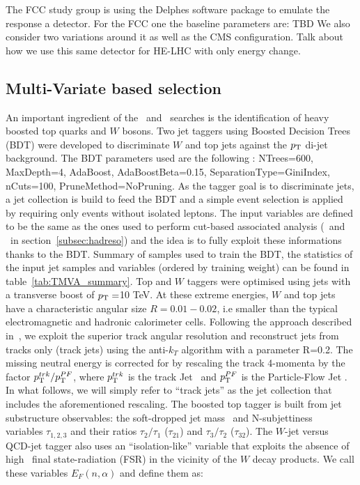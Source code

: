 The FCC study group is using the Delphes software package to emulate the response a detector. 
For the FCC one the baseline parameters are: TBD
We also consider two variations around it as well as the CMS configuration.
Talk about how we use this same detector for HE-LHC with only energy change.


\subsection{Multi-Variate based selection}
\label{subsec:mvatagger}

An important ingredient of the \Zptt\ and \rsg\ searches is the identification of heavy boosted top quarks and $W$ bosons. Two jet taggers using Boosted Decision Trees (BDT) were developed to discriminate $W$ and top jets against the $p_{\text{T}}$ di-jet background.
\newline
The BDT parameters used are the following : NTrees=600, MaxDepth=4, AdaBoost, AdaBoostBeta=0.15, SeparationType=GiniIndex, nCuts=100, PruneMethod=NoPruning. As the tagger goal is to discriminate jets, a jet collection is build to feed the BDT and a simple event selection is applied by requiring only events without isolated leptons.
The input variables are defined to be the same as the ones used to perform cut-based associated analysis (\Zptt\ and \rsg\ in section~\ref{subsec:hadreso}) and the idea is to fully exploit these informations thanks to the BDT. Summary of samples used to train the BDT, the statistics of the input jet samples and variables (ordered by training weight) can be found in table~\ref{tab:TMVA_summary}.
\newline
Top and $W$ taggers were optimised using jets with a transverse boost of $p_{\text{T}}=$10 TeV. At these extreme energies, $W$ and top jets have a characteristic angular size $R=0.01-0.02$, i.e smaller than the typical electromagnetic and hadronic calorimeter cells. Following the approach described in~\cite{Larkoski:2015yqa}, we exploit the superior track angular resolution and reconstruct jets from tracks only (track jets) using the anti-$k_T$ algorithm with a parameter R=0.2. The missing neutral energy is corrected for by rescaling the track 4-momenta by the factor $p_{\text{T}}^{trk}/p_{\text{T}}^{PF}$, where $p_{\text{T}}^{trk}$ is the track Jet \pt\ and $p_{\text{T}}^{PF}$ is the Particle-Flow Jet \pT. In what follows, we will simply refer to ``track jets'' as the jet collection that includes the aforementioned rescaling.
\newline
The boosted top tagger is built from jet substructure observables: the soft-dropped jet mass~\cite{Larkoski:2014wba} and N-subjettiness~\cite{Thaler:2010tr} variables $\tau_{1,2,3}$ and their ratios $\tau_{2}/\tau_{1}$ ($\tau_{21}$) and $\tau_{3}/\tau_{2}$ ($\tau_{32}$). The $W$-jet versus QCD-jet tagger also uses an ``isolation-like'' variable that exploits the absence of high \pt\ final state-radiation (FSR) in the vicinity of the $W$ decay products. We call these variables $E_{F}(n,\alpha)$ and define them as:

